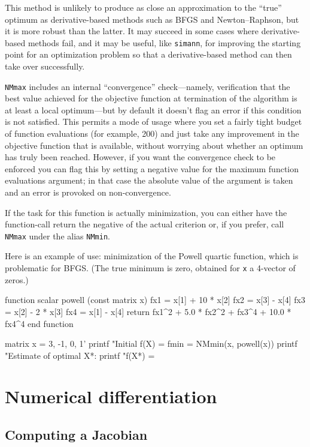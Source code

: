 This method is unlikely to produce as close an approximation to the
``true'' optimum as derivative-based methods such as BFGS and
Newton--Raphson, but it is more robust than the latter. It may succeed
in some cases where derivative-based methods fail, and it may be
useful, like \texttt{simann}, for improving the starting point for an
optimization problem so that a derivative-based method can then take
over successfully.

\texttt{NMmax} includes an internal ``convergence'' check---namely,
verification that the best value achieved for the objective function
at termination of the algorithm is at least a local optimum---but by
default it doesn't flag an error if this condition is not
satisfied. This permits a mode of usage where you set a fairly tight
budget of function evaluations (for example, 200) and just take any
improvement in the objective function that is available, without
worrying about whether an optimum has truly been reached. However, if
you want the convergence check to be enforced you can flag this by
setting a negative value for the maximum function evaluations
argument; in that case the absolute value of the argument is taken and
an error is provoked on non-convergence.

If the task for this function is actually minimization, you can either
have the function-call return the negative of the actual criterion or,
if you prefer, call \texttt{NMmax} under the alias \texttt{NMmin}.

Here is an example of use: minimization of the Powell quartic
function, which is problematic for BFGS. (The true minimum is zero,
obtained for \texttt{x} a 4-vector of zeros.)
%
\begin{code}
function scalar powell (const matrix x)
  fx1 = x[1] + 10 * x[2]
  fx2 = x[3] - x[4]
  fx3 = x[2] - 2 * x[3]
  fx4 = x[1] - x[4]
  return fx1^2 + 5.0 * fx2^2 + fx3^4 + 10.0 * fx4^4
end function

matrix x = {3, -1, 0, 1}'
printf "Initial f(X) = %
fmin = NMmin(x, powell(x))
printf "Estimate of optimal X*:\n%
printf "f(X*) = %
\end{code}

\section{Numerical differentiation}
\label{sec:numdiff}

\subsection{Computing a Jacobian}
\label{sec:fdjac}

